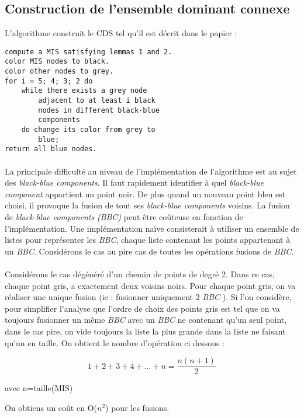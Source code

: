\subsection{Construction de l'ensemble dominant connexe}
L'algorithme construit le CDS tel qu'il est décrit dans le papier :
\begin{lstlisting}
compute a MIS satisfying lemmas 1 and 2.
color MIS nodes to black.
color other nodes to grey.
for i = 5; 4; 3; 2 do
	while there exists a grey node
		adjacent to at least i black
		nodes in different black-blue
		components
	do change its color from grey to
		blue;
return all blue nodes.
\end{lstlisting}

\paragraph{}
La principale difficulté au niveau de l'implémentation de l'algorithme est au sujet des \textit{black-blue components}. Il faut rapidement identifier à quel \textit{black-blue component} appartient un point noir.
De plus quand un nouveau point bleu est choisi, il provoque la fusion de tout ses \textit{black-blue components} voisins.
La fusion de \textit{black-blue components} \textit{(BBC)} peut être coûteuse en fonction de l'implémentation.
Une implémentation naïve consisterait à utiliser un ensemble de listes pour représenter les \textit{BBC}, chaque liste contenant les points appartenant à un \textit{BBC}.
Considérons le cas au pire cas de toutes les opérations fusions de \textit{BBC}.

\paragraph{}
Considérons le cas dégénéré d'un chemin de points de degré 2.
Dans ce cas, chaque point gris, a exactement deux voisins noirs.
Pour chaque point gris, on va réaliser une unique fusion (ie : fusionner uniquement 2 \textit{BBC} ).
Si l'on considère, pour simplifier l'analyse que l'ordre de choix des points gris est tel que on va toujours fusionner un même \textit{BBC} avec un \textit{BBC} ne contenant qu'un seul point, dans le cas pire, on vide toujours la liste la plus grande dans la liste ne faisant qu'un en taille. On obtient le nombre d'opération ci dessous :

\[
1 + 2 + 3 + 4 + \dots + n = \frac{n(n+1)}{2} 
\]

avec n=taille(MIS)

On obtiens un coût en O($n{^2}$) pour les fusions.

